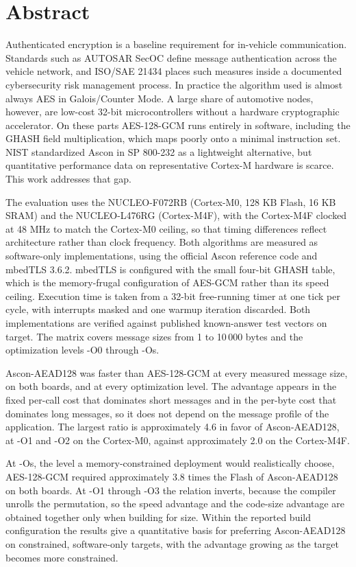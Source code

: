 \documentclass[a4paper,oneside,openany]{scrbook}
\begin{document}
\pagestyle{headings}


\chapter*{Abstract}
Authenticated encryption is a baseline requirement for in-vehicle
communication. Standards such as AUTOSAR SecOC define message authentication
across the vehicle network, and ISO/SAE 21434 places such measures inside a
documented cybersecurity risk management process. In practice the algorithm
used is almost always AES in Galois/Counter Mode. A large share of automotive
nodes, however, are low-cost 32-bit microcontrollers without a hardware
cryptographic accelerator. On these parts AES-128-GCM runs entirely in
software, including the GHASH field multiplication, which maps poorly onto a
minimal instruction set. NIST standardized Ascon in SP 800-232 as a lightweight
alternative, but quantitative performance data on representative Cortex-M
hardware is scarce. This work addresses that gap.

The evaluation uses the NUCLEO-F072RB (Cortex-M0, 128 KB Flash, 16 KB SRAM)
and the NUCLEO-L476RG (Cortex-M4F), with the Cortex-M4F clocked at 48 MHz to
match the Cortex-M0 ceiling, so that timing differences reflect architecture
rather than clock frequency. Both algorithms are measured as software-only
implementations, using the official Ascon reference code and mbedTLS 3.6.2.
mbedTLS is configured with the small four-bit GHASH table, which is the
memory-frugal configuration of AES-GCM rather than its speed ceiling. Execution
time is taken from a 32-bit free-running timer at one tick per cycle, with
interrupts masked and one warmup iteration discarded. Both implementations are
verified against published known-answer test vectors on target. The matrix
covers message sizes from 1 to 10\,000 bytes and the optimization levels -O0
through -Os.

Ascon-AEAD128 was faster than AES-128-GCM at every measured message size, on
both boards, and at every optimization level. The advantage appears in the
fixed per-call cost that dominates short messages and in the per-byte cost that
dominates long messages, so it does not depend on the message profile of the
application. The largest ratio is approximately 4.6 in favor of Ascon-AEAD128,
at -O1 and -O2 on the Cortex-M0, against approximately 2.0 on the Cortex-M4F.

At -Os, the level a memory-constrained deployment would realistically choose,
AES-128-GCM required approximately 3.8 times the Flash of Ascon-AEAD128 on both
boards. At -O1 through -O3 the relation inverts, because the compiler unrolls
the permutation, so the speed advantage and the code-size advantage are
obtained together only when building for size. Within the reported build
configuration the results give a quantitative basis for preferring
Ascon-AEAD128 on constrained, software-only targets, with the advantage growing
as the target becomes more constrained.
\end{document}
